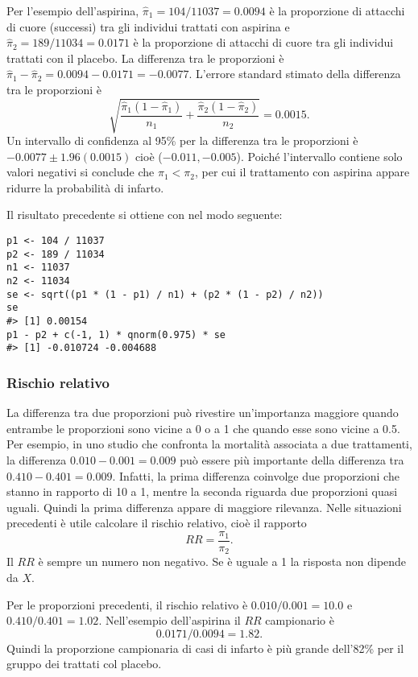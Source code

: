 \begin{exmp}
Per l'esempio dell'aspirina, $\hat{\pi}_1=104/11037 = 0.0094$ è la proporzione di attacchi di cuore (successi) tra gli individui trattati con aspirina e $\hat{\pi}_2=189/11034 = 0.0171$
è la proporzione di attacchi di cuore  tra gli individui trattati
con il placebo.
La differenza tra le proporzioni è $\hat{\pi}_1 - \hat{\pi}_2 =  0.0094 - 0.0171  = -0.0077$.
L'errore standard stimato della differenza tra le proporzioni è
\[
\sqrt{\frac{\hat{\pi}_1(1-\hat{\pi}_1)}{n_1} +
\frac{\hat{\pi}_2(1-\hat{\pi}_2)}{n_2}} = 0.0015.
\]
Un intervallo di confidenza al 95\% per la differenza tra le proporzioni è $-0.0077 \pm 1.96(0.0015)$ cioè ($-0.011, -0.005$).
Poiché l'intervallo contiene solo valori negativi si conclude che $\pi_1 < \pi_2$, per cui il trattamento con aspirina appare ridurre la probabilità di infarto.

Il risultato precedente si ottiene con \R nel modo seguente:
\begin{lstlisting}
p1 <- 104 / 11037
p2 <- 189 / 11034
n1 <- 11037
n2 <- 11034
se <- sqrt((p1 * (1 - p1) / n1) + (p2 * (1 - p2) / n2))
se
#> [1] 0.00154
p1 - p2 + c(-1, 1) * qnorm(0.975) * se
#> [1] -0.010724 -0.004688
\end{lstlisting}

\end{exmp}

\subsubsection{Rischio relativo}

La differenza tra due proporzioni può rivestire un'importanza maggiore quando entrambe le proporzioni sono vicine a 0 o a 1 che quando esse sono vicine a 0.5.
Per esempio, in uno studio che confronta la mortalità
associata a due trattamenti, la differenza $0.010 - 0.001 = 0.009$
può essere più importante della differenza tra $0.410 - 0.401 =
0.009$.
Infatti, la prima differenza coinvolge due proporzioni che
stanno in rapporto di 10 a 1, mentre la seconda riguarda due
proporzioni quasi uguali. Quindi la prima differenza appare di
maggiore rilevanza.
Nelle situazioni precedenti è utile calcolare il rischio
relativo, cioè il rapporto
\[
RR = \frac{\pi_1}{\pi_2}.
\]
Il $RR$ è sempre un numero non negativo. 
Se è uguale a 1 la risposta non dipende da $X$.

\begin{exmp}
Per le proporzioni precedenti, il rischio relativo è $0.010/0.001=10.0$ e $0.410/0.401=1.02$.
Nell'esempio dell'aspirina il $RR$ campionario è
\[
0.0171/0.0094 = 1.82.
\]
Quindi la proporzione campionaria di casi di infarto è più grande dell'82\% per il gruppo dei trattati col placebo.
\end{exmp}



